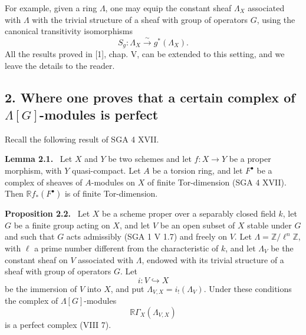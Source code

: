 \documentclass[11pt]{article}
\newenvironment{statement}[1]{\par\medskip\noindent\textbf{#1.}\ }{\par\medskip}
\begin{document}
For example, given a ring $\Lambda$, one may equip the constant sheaf $\Lambda_X$ associated with $\Lambda$ with the trivial structure of a sheaf with group of operators $G$, using the canonical transitivity isomorphisms
\[
S_g:\Lambda_X\xrightarrow{\sim}g^*(\Lambda_X).
\]
All the results proved in [1], chap. V, can be extended to this setting, and we leave the details to the reader.

\subsection*{2. Where one proves that a certain complex of $\Lambda[G]$-modules is perfect}

Recall the following result of SGA 4 XVII.

\begin{statement}{Lemma 2.1}
Let $X$ and $Y$ be two schemes and let $f:X\to Y$ be a proper morphism, with $Y$ quasi-compact. Let $A$ be a torsion ring, and let $F^\bullet$ be a complex of sheaves of $A$-modules on $X$ of finite Tor-dimension (SGA 4 XVII). Then $\mathbb{R} f_*(F^\bullet)$ is of finite Tor-dimension.
\end{statement}

\begin{statement}{Proposition 2.2}
Let $X$ be a scheme proper over a separably closed field $k$, let $G$ be a finite group acting on $X$, and let $V$ be an open subset of $X$ stable under $G$ and such that $G$ acts admissibly (SGA 1 V 1.7) and freely on $V$. Let $\Lambda=\mathbb Z/\ell^n\mathbb Z$, with $\ell$ a prime number different from the characteristic of $k$, and let $\Lambda_V$ be the constant sheaf on $V$ associated with $\Lambda$, endowed with its trivial structure of a sheaf with group of operators $G$. Let
\[
i:V\hookrightarrow X
\]
be the immersion of $V$ into $X$, and put $\Lambda_{V,X}=i_!(\Lambda_V)$. Under these conditions the complex of $\Lambda[G]$-modules
\[
\mathbb{R}\Gamma_X(\Lambda_{V,X})
\]
is a perfect complex (VIII 7).
\end{statement}
\end{document}
